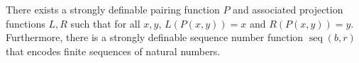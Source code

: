 There exists a strongly definable pairing function $P$ and associated projection functions $L, R$ such that for all $x, y$, $L(P(x,y)) = x$ and $R(P(x,y)) = y$. Furthermore, there is a strongly definable sequence number function $\operatorname{seq}(b, r)$ that encodes finite sequences of natural numbers.
